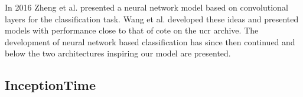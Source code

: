 In 2016 Zheng et al. \cite{Zheng2016} presented a neural network model based on convolutional layers for the classification task. Wang et al. \cite{Wang2017} developed these ideas and presented models with performance close to that of \gls{cote} on the \gls{ucr} archive. The development of neural network based classification has since then continued and below the two architectures inspiring our model are presented.

\subsection{InceptionTime}
